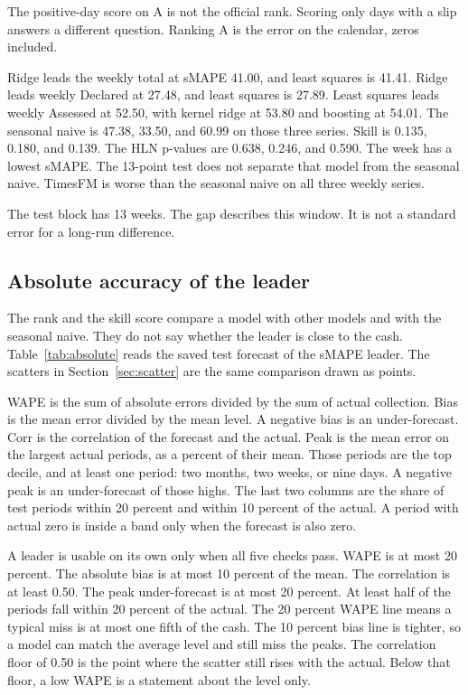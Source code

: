 The positive-day score on A is not the official rank.
Scoring only days with a slip answers a different question.
Ranking A is the error on the calendar, zeros included.

\label{sec:weekly}
Ridge leads the weekly total at sMAPE 41.00, and least squares is 41.41.
Ridge leads weekly Declared at 27.48, and least squares is 27.89.
Least squares leads weekly Assessed at 52.50, with kernel ridge at 53.80 and boosting at 54.01.
The seasonal naive is 47.38, 33.50, and 60.99 on those three series.
Skill is 0.135, 0.180, and 0.139.
The HLN p-values are 0.638, 0.246, and 0.590.
The week has a lowest sMAPE.
The 13-point test does not separate that model from the seasonal naive.
TimesFM is worse than the seasonal naive on all three weekly series.

The test block has 13 weeks.
The gap describes this window.
It is not a standard error for a long-run difference.

\subsection{Absolute accuracy of the leader}
\label{sec:absolute}

The rank and the skill score compare a model with other models and with the seasonal naive.
They do not say whether the leader is close to the cash.
Table~\ref{tab:absolute} reads the saved test forecast of the sMAPE leader.
The scatters in Section~\ref{sec:scatter} are the same comparison drawn as points.

WAPE is the sum of absolute errors divided by the sum of actual collection.
Bias is the mean error divided by the mean level.
A negative bias is an under-forecast.
Corr is the correlation of the forecast and the actual.
Peak is the mean error on the largest actual periods, as a percent of their mean.
Those periods are the top decile, and at least one period: two months, two weeks, or nine days.
A negative peak is an under-forecast of those highs.
The last two columns are the share of test periods within 20 percent and within 10 percent of the actual.
A period with actual zero is inside a band only when the forecast is also zero.

A leader is usable on its own only when all five checks pass.
WAPE is at most 20 percent.
The absolute bias is at most 10 percent of the mean.
The correlation is at least 0.50.
The peak under-forecast is at most 20 percent.
At least half of the periods fall within 20 percent of the actual.
The 20 percent WAPE line means a typical miss is at most one fifth of the cash.
The 10 percent bias line is tighter, so a model can match the average level and still miss the peaks.
The correlation floor of 0.50 is the point where the scatter still rises with the actual.
Below that floor, a low WAPE is a statement about the level only.

